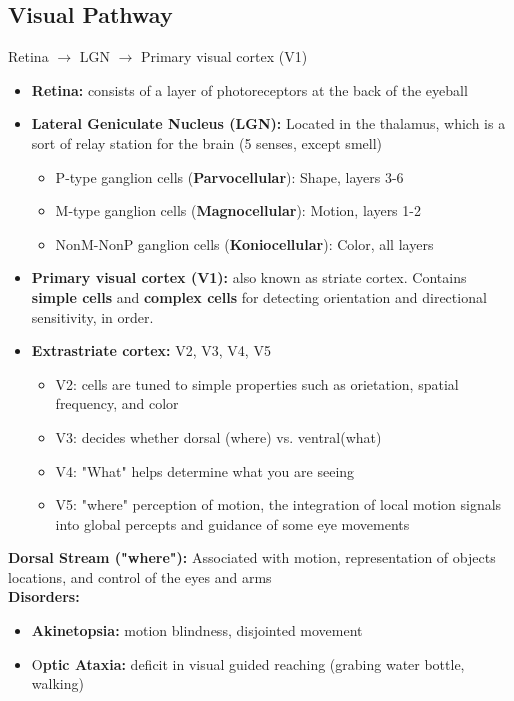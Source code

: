 \documentclass{article}
\begin{document}
\subsection{Visual Pathway}
Retina $\rightarrow$ LGN $\rightarrow$ Primary visual cortex (V1) 

\begin{itemize}
    \item \textbf{Retina:} consists of a layer of photoreceptors at the back of the eyeball
    \item \textbf{Lateral Geniculate Nucleus (LGN):} Located in the thalamus, which is a sort of relay station for the brain (5 senses, except smell) 
    \begin{itemize}
        \item P-type ganglion cells (\textbf{Parvocellular}): Shape, layers 3-6
        \item M-type ganglion cells (\textbf{Magnocellular}): Motion, layers 1-2 
        \item NonM-NonP ganglion cells (\textbf{Koniocellular}): Color, all layers
    \end{itemize}
    \item \textbf{Primary visual cortex (V1):} also known as striate cortex. Contains \textbf{simple cells} and \textbf{complex cells} for detecting orientation and directional sensitivity, in order. 
    \item \textbf{Extrastriate cortex:} V2, V3, V4, V5
    \begin{itemize}
        \item V2: cells are tuned to simple properties such as orietation, spatial frequency, and color
        \item V3: decides whether dorsal (where) vs. ventral(what) 
        \item V4: "What" helps determine what you are seeing
        \item V5: "where" perception of motion, the integration of local motion signals into global percepts and guidance of some eye movements
    \end{itemize}
\end{itemize}

\noindent\textbf{Dorsal Stream ("where"):} Associated with motion, representation of objects locations, and control of the eyes and arms \\
\textbf{Disorders:}
\begin{itemize}
    \item \textbf{Akinetopsia:} motion blindness, disjointed movement
    \item O\textbf{ptic Ataxia:} deficit in visual guided reaching (grabing water bottle, walking) 
\end{itemize}
\end{document}

